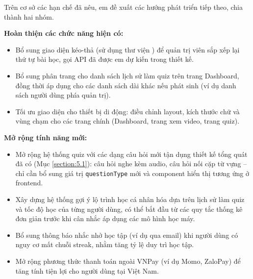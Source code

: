 \documentclass[../DoAn.tex]{subfiles}
\begin{document}
Trên cơ sở các hạn chế đã nêu, em đề xuất các hướng phát triển tiếp theo, chia thành hai nhóm.

\textbf{Hoàn thiện các chức năng hiện có:}

\begin{itemize}
    \item Bổ sung giao diện kéo-thả (sử dụng thư viện \texttt{}) để quản trị viên sắp xếp lại thứ tự bài học, gọi API \texttt{} đã được em dự kiến trong thiết kế.
    \item Bổ sung phân trang cho danh sách lịch sử làm quiz trên trang Dashboard, đồng thời áp dụng cho các danh sách dài khác nếu phát sinh (ví dụ danh sách người dùng phía quản trị).
    \item Tối ưu giao diện cho thiết bị di động: điều chỉnh layout, kích thước chữ và vùng chạm cho các trang chính (Dashboard, trang xem video, trang quiz).
\end{itemize}

\textbf{Mở rộng tính năng mới:}

\begin{itemize}
    \item Mở rộng hệ thống quiz với các dạng câu hỏi mới tận dụng thiết kế tổng quát đã có (Mục \ref{section:5.1}): câu hỏi nghe kèm audio, câu hỏi nối cặp từ vựng -- chỉ cần bổ sung giá trị \texttt{questionType} mới và component hiển thị tương ứng ở frontend.
    \item Xây dựng hệ thống gợi ý lộ trình học cá nhân hóa dựa trên lịch sử làm quiz và tốc độ học của từng người dùng, có thể bắt đầu từ các quy tắc thống kê đơn giản trước khi cân nhắc áp dụng các mô hình học máy.
    \item Bổ sung thông báo nhắc nhở học tập (ví dụ qua email) khi người dùng có nguy cơ mất chuỗi streak, nhằm tăng tỷ lệ duy trì học tập.
    \item Mở rộng phương thức thanh toán ngoài VNPay (ví dụ Momo, ZaloPay) để tăng tính tiện lợi cho người dùng tại Việt Nam.
\end{itemize}
\end{document}
